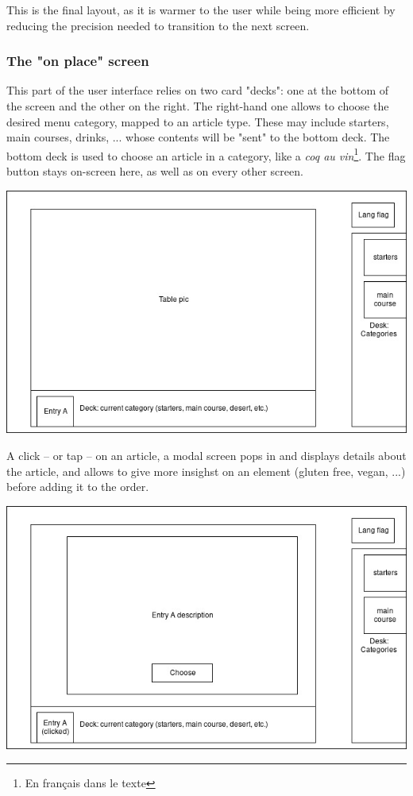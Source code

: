\documentclass[a4paper,12pt]{article}
\begin{document}
This is the final layout, as it is warmer to the user while being more efficient by reducing the precision needed to
transition to the next screen.

\subsubsection{The "on place" screen}

This part of the user interface relies on two card "decks": one at the bottom of the screen and the other on the
right. The right-hand one allows to choose the desired menu category, mapped to an article type. These may include
starters, main courses, drinks, ... whose contents will be "sent" to the bottom deck. The bottom deck is used to
choose an article in a category, like a \emph{coq au vin}\footnote{En français dans le texte}. The flag button stays
on-screen here, as well as on every other screen.

\begin{center}
	\includegraphics[width=\textwidth]{in_place_screen1.jpg}
\end{center}

A click -- or tap -- on an article, a modal screen pops in and displays details about the article, and allows to
give more insighst on an element (gluten free, vegan, ...) before adding it to the order.

\begin{center}
	\includegraphics[width=\textwidth]{in_place_screen2.jpg}
\end{center}
\end{document}
